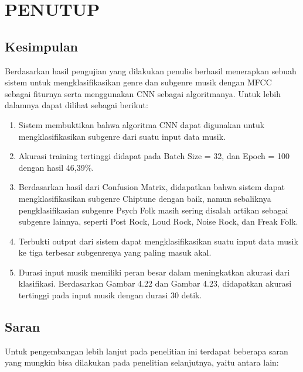 \chapter{PENUTUP}
\label{chap:penutup}


\section{Kesimpulan}
\label{sec:kesimpulan}

Berdasarkan hasil pengujian yang dilakukan penulis berhasil menerapkan sebuah sistem untuk mengklasifikasikan genre dan subgenre musik dengan MFCC sebagai fiturnya serta menggunakan CNN sebagai algoritmanya. Untuk lebih dalamnya dapat dilihat sebagai berikut:

\begin{enumerate}[nolistsep]

  \item Sistem membuktikan bahwa algoritma CNN dapat digunakan untuk mengklasifikasikan subgenre dari suatu input data musik.

  \item Akurasi training tertinggi didapat pada Batch Size = 32, dan Epoch = 100 dengan hasil 46,39\%.

  \item Berdasarkan hasil dari Confusion Matrix, didapatkan bahwa sistem dapat mengklasifikasikan subgenre Chiptune dengan baik, namun sebaliknya pengklasifikasian subgenre Psych Folk masih sering disalah artikan sebagai subgenre lainnya, seperti Post Rock, Loud Rock, Noise Rock, dan Freak Folk.
  
  \item Terbukti output dari sistem dapat mengklasifikasikan suatu input data musik ke tiga terbesar subgenrenya yang paling masuk akal.
  
  \item Durasi input musik memiliki peran besar dalam meningkatkan akurasi dari klasifikasi. Berdasarkan Gambar 4.22 dan Gambar 4.23, didapatkan akurasi tertinggi pada input musik dengan durasi 30 detik.

\end{enumerate}

\section{Saran}
\label{chap:saran}

Untuk pengembangan lebih lanjut pada penelitian ini terdapat beberapa saran yang mungkin bisa dilakukan pada penelitian selanjutnya, yaitu antara lain:


